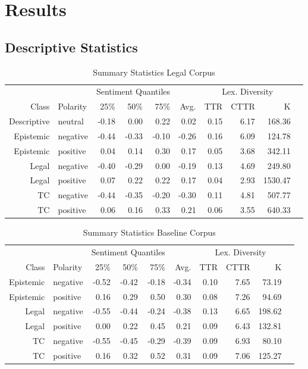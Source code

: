 \documentclass{article}
\begin{document}
\section{Results}

\subsection{Descriptive Statistics}

\begin{table}[ht]
\centering
{}
\begin{tabular}{rlrrrrrrrr}
  & & \multicolumn{3}{c}{Sentiment Quantiles} & & \multicolumn{3}{c}{Lex. Diversity}\\
   \cmidrule{3-5} \cmidrule{7-9}
  Class & Polarity & 25\% & 50\% & 75\% & Avg. &  TTR & CTTR & K\\
  \bottomrule
Descriptive & neutral & -0.18 & 0.00 & 0.22 & 0.02 & 0.15 & 6.17 & 168.36 \\ 
  Epistemic & negative & -0.44 & -0.33 & -0.10 & -0.26 & 0.16 & 6.09 & 124.78 \\ 
  Epistemic & positive & 0.04 & 0.14 & 0.30 & 0.17 & 0.05 & 3.68 & 342.11 \\ 
  Legal & negative & -0.40 & -0.29 & 0.00 & -0.19 & 0.13 & 4.69 & 249.80 \\ 
  Legal & positive & 0.07 & 0.22 & 0.22 & 0.17 & 0.04 & 2.93 & 1530.47 \\ 
  TC & negative & -0.44 & -0.35 & -0.20 & -0.30 & 0.11 & 4.81 & 507.77 \\ 
  TC & positive & 0.06 & 0.16 & 0.33 & 0.21 & 0.06 & 3.55 & 640.33 \\ 
   \hline
\end{tabular}
\caption{Summary Statistics Legal Corpus}
\end{table}

\begin{table}[ht]
\centering
{}
\begin{tabular}{rlrrrrrrrr}
  & & \multicolumn{3}{c}{Sentiment Quantiles} & & \multicolumn{3}{c}{Lex. Diversity}\\
   \cmidrule{3-5} \cmidrule{7-9}
  Class & Polarity & 25\% & 50\% & 75\% & Avg. &  TTR & CTTR & K\\
  \bottomrule
Epistemic & negative & -0.52 & -0.42 & -0.18 & -0.34 & 0.10 & 7.65 & 73.19 \\ 
  Epistemic & positive & 0.16 & 0.29 & 0.50 & 0.30 & 0.08 & 7.26 & 94.69 \\ 
  Legal & negative & -0.55 & -0.44 & -0.24 & -0.38 & 0.13 & 6.65 & 198.62 \\ 
  Legal & positive & 0.00 & 0.22 & 0.45 & 0.21 & 0.09 & 6.43 & 132.81 \\ 
  TC & negative & -0.55 & -0.45 & -0.29 & -0.39 & 0.09 & 6.93 & 80.10 \\ 
  TC & positive & 0.16 & 0.32 & 0.52 & 0.31 & 0.09 & 7.06 & 125.27 \\ 
   \hline
\end{tabular}
   \caption{Summary Statistics Baseline Corpus}
\end{table}
\end{document}
